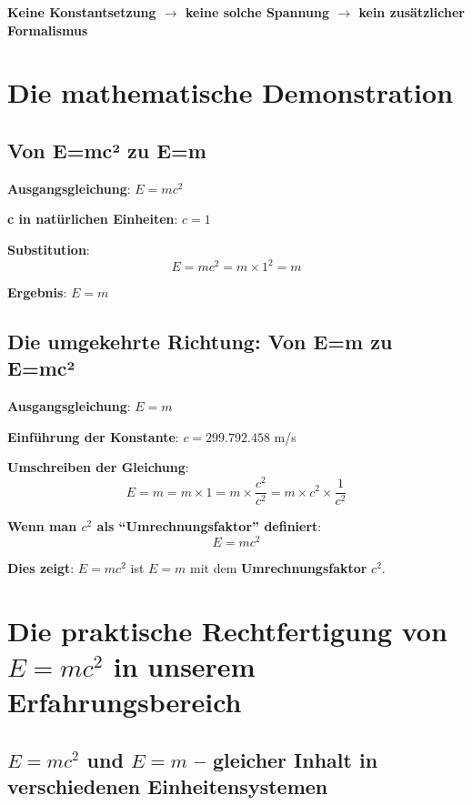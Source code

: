 	\textbf{Keine Konstantsetzung $\rightarrow$ keine solche Spannung $\rightarrow$ kein zusätzlicher Formalismus}
	
	\section{Die mathematische Demonstration}
	
	\subsection{Von E=mc² zu E=m}
	
	\textbf{Ausgangsgleichung}: $E = mc^2$
	
	\textbf{c in natürlichen Einheiten}: $c = 1$
	
	\textbf{Substitution}:
	\begin{equation}
		E = mc^2 = m \times 1^2 = m
	\end{equation}
	
	\textbf{Ergebnis}: $E = m$
	
	\subsection{Die umgekehrte Richtung: Von E=m zu E=mc²}
	
	\textbf{Ausgangsgleichung}: $E = m$
	
	\textbf{Einführung der Konstante}: $c = 299.792.458$ m/s
	
	\textbf{Umschreiben der Gleichung}:
	\begin{equation}
		E = m = m \times 1 = m \times \frac{c^2}{c^2} = m \times c^2 \times \frac{1}{c^2}
	\end{equation}
	
	\textbf{Wenn man $c^2$ als ``Umrechnungsfaktor'' definiert}:
	\begin{equation}
		E = mc^2
	\end{equation}
	
	\textbf{Dies zeigt}: $E = mc^2$ ist $E = m$ mit dem \textbf{Umrechnungsfaktor} $c^2$.
	
	\section{Die praktische Rechtfertigung von \( E = mc^2 \) in unserem Erfahrungsbereich}
	
	\subsection{\( E = mc^2 \) und \( E = m \) – gleicher Inhalt in verschiedenen Einheitensystemen}
	
